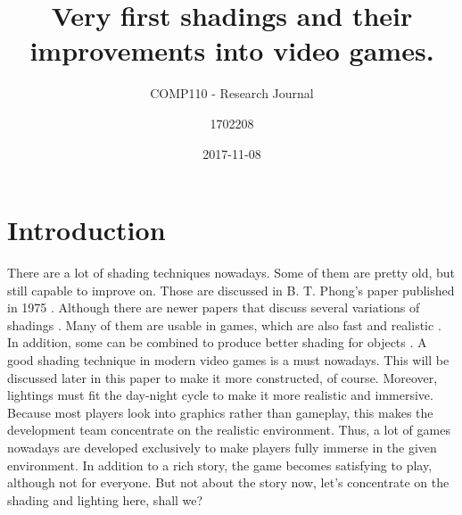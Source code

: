 \documentclass{scrartcl}
\title{Very first shadings and their improvements into video games.}
\subtitle{COMP110 - Research Journal}
\author{1702208}
\date{2017-11-08}
\begin{document}
\maketitle{}

\newpage{}

\section{Introduction}
There are a lot of shading techniques nowadays.
Some of them are pretty old, but still capable to improve on.
Those are discussed in B. T. Phong's paper published in 1975 \cite{phong1975illumination}.
Although there are newer papers that discuss several variations of shadings \cite{zhang1994analysis}.
Many of them are usable in games, which are also fast and realistic \cite{iones2003fast}.
In addition, some can be combined to produce better shading for objects \cite{blinn1976texture}.
A good shading technique in modern video games is a must nowadays.
This will be discussed later in this paper to make it more constructed, of course.
Moreover, lightings must fit the day-night cycle to make it more realistic and immersive.
Because most players look into graphics rather than gameplay, this makes the development team concentrate on the realistic environment.
Thus, a lot of games nowadays are developed exclusively to make players fully immerse in the given environment.
In addition to a rich story, the game becomes satisfying to play, although not for everyone.
But not about the story now, let's concentrate on the shading and lighting here, shall we?
\end{document}

